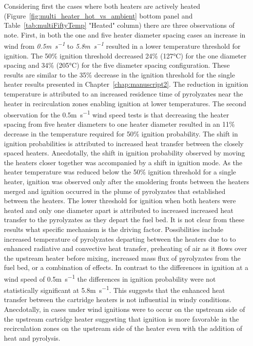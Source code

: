     Considering first the cases where both heaters are actively heated (Figure~\ref{fig:multi_heater_hot_vs_ambient} bottom panel and Table~\ref{tab:multiFiftyTemp} "Heated" column) there are three observations of note. First, in both the one and five heater diameter spacing cases an increase in wind from \textit{0.5\si{\meter\per\second}} to \textit{5.8\si{\meter\per\second}} resulted in a lower temperature threshold for ignition. The 50\% ignition threshold decreased 24\% (127\si{\celsius}) for the one diameter spacing and 34\% (205\si{\celsius}) for the five diameter spacing configuration. These results are similar to the 35\% decrease in the ignition threshold for the single heater results presented in Chapter~\ref{chap:manuscript2}. The reduction in ignition temperature is attributed to an increased residence time of pyrolyzates near the heater in recirculation zones enabling ignition at lower temperatures. The second observation for the 0.5\si{\meter\per\second} wind speed tests is that decreasing the heater spacing from five heater diameters to one heater diameter resulted in an 11\% decrease in the temperature required for 50\% ignition probability. The shift in ignition probabilities is attributed to increased heat transfer between the closely spaced heaters. Anecdotally, the shift in ignition probability observed by moving the heaters closer together was accompanied by a shift in ignition mode. As the heater temperature was reduced below the 50\% ignition threshold for a single heater, ignition was observed only after the smoldering fronts between the heaters merged and ignition occurred in the plume of pyrolyzates that established between the heaters. The lower threshold for ignition when both heaters were heated and only one diameter apart is attributed to increased increased heat transfer to the pyrolyzates as they depart the fuel bed. It is not clear from these results what specific mechanism is the driving factor. Possibilities include increased temperature of pyrolyzates departing between the heaters due to to enhanced radiative and convective heat transfer, preheating of air as it flows over the upstream heater before mixing, increased mass flux of pyrolyzates from the fuel bed, or a combination of effects. In contrast to the differences in ignition at a wind speed of 0.5\si{\meter\per\second} the differences in ignition probability were not statistically significant at 5.8\si{\meter\per\second}. This suggests that the enhanced heat transfer between the cartridge heaters is not influential in windy conditions. Anecdotally, in cases under wind ignitions were to occur on the upstream side of the upstream cartridge heater suggesting that ignition is more favorable in the recirculation zones on the upstream side of the heater even with the addition of heat and pyrolysis.
   
